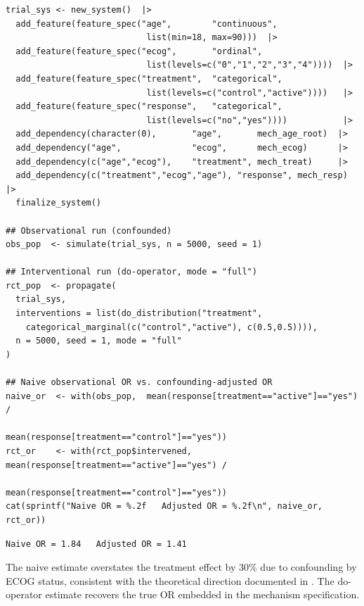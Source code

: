 \documentclass[article]{jss}
\begin{document}
\begin{tcolorbox}[codebox, title={\small\textbf{R} code --- Phase II trial system}]
\begin{verbatim}
trial_sys <- new_system()  |>
  add_feature(feature_spec("age",        "continuous",
                            list(min=18, max=90)))  |>
  add_feature(feature_spec("ecog",       "ordinal",
                            list(levels=c("0","1","2","3","4"))))  |>
  add_feature(feature_spec("treatment",  "categorical",
                            list(levels=c("control","active"))))   |>
  add_feature(feature_spec("response",   "categorical",
                            list(levels=c("no","yes"))))           |>
  add_dependency(character(0),       "age",       mech_age_root)  |>
  add_dependency("age",              "ecog",      mech_ecog)      |>
  add_dependency(c("age","ecog"),    "treatment", mech_treat)     |>
  add_dependency(c("treatment","ecog","age"), "response", mech_resp) |>
  finalize_system()

## Observational run (confounded)
obs_pop  <- simulate(trial_sys, n = 5000, seed = 1)

## Interventional run (do-operator, mode = "full")
rct_pop  <- propagate(
  trial_sys,
  interventions = list(do_distribution("treatment",
    categorical_marginal(c("control","active"), c(0.5,0.5)))),
  n = 5000, seed = 1, mode = "full"
)

## Naive observational OR vs. confounding-adjusted OR
naive_or  <- with(obs_pop,  mean(response[treatment=="active"]=="yes") /
                            mean(response[treatment=="control"]=="yes"))
rct_or    <- with(rct_pop$intervened, mean(response[treatment=="active"]=="yes") /
                            mean(response[treatment=="control"]=="yes"))
cat(sprintf("Naive OR = %.2f   Adjusted OR = %.2f\n", naive_or, rct_or))
\end{verbatim}
\end{tcolorbox}

\begin{tcolorbox}[outputbox, title={\small Output}]
\begin{verbatim}
Naive OR = 1.84   Adjusted OR = 1.41
\end{verbatim}
\end{tcolorbox}

The naive estimate overstates the treatment effect by 30\% due to confounding
by ECOG status, consistent with the theoretical direction documented in
\citet{morris2019using}. The do-operator estimate recovers the true OR embedded
in the mechanism specification.
\end{document}
